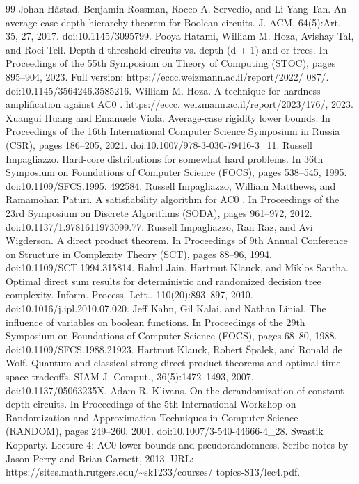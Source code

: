 \begin{thebibliography}{99}
 Johan Håstad, Benjamin Rossman, Rocco A. Servedio, and Li-Yang Tan. An average-case depth hierarchy theorem for Boolean circuits. J. ACM, 64(5):Art. 35, 27, 2017. doi:10.1145/3095799.
 Pooya Hatami, William M. Hoza, Avishay Tal, and Roei Tell. Depth-d threshold circuits vs. depth-(d + 1) and-or trees. In Proceedings of the 55th Symposium on Theory of Computing (STOC), pages 895–904, 2023. Full version: https://eccc.weizmann.ac.il/report/2022/ 087/. doi:10.1145/3564246.3585216.   
 William M. Hoza. A technique for hardness amplification against AC0 . https://eccc. weizmann.ac.il/report/2023/176/, 2023.
 Xuangui Huang and Emanuele Viola. Average-case rigidity lower bounds. In Proceedings of the 16th International Computer Science Symposium in Russia (CSR), pages 186–205, 2021. doi:10.1007/978-3-030-79416-3\_11.
 Russell Impagliazzo. Hard-core distributions for somewhat hard problems. In 36th Symposium on Foundations of Computer Science (FOCS), pages 538–545, 1995. doi:10.1109/SFCS.1995. 492584.
 Russell Impagliazzo, William Matthews, and Ramamohan Paturi. A satisfiability algorithm for AC0 . In Proceedings of the 23rd Symposium on Discrete Algorithms (SODA), pages 961–972, 2012. doi:10.1137/1.9781611973099.77.
 Russell Impagliazzo, Ran Raz, and Avi Wigderson. A direct product theorem. In Proceedings of 9th Annual Conference on Structure in Complexity Theory (SCT), pages 88–96, 1994. doi:10.1109/SCT.1994.315814.
 Rahul Jain, Hartmut Klauck, and Miklos Santha. Optimal direct sum results for deterministic and randomized decision tree complexity. Inform. Process. Lett., 110(20):893–897, 2010. doi:10.1016/j.ipl.2010.07.020.
 Jeff Kahn, Gil Kalai, and Nathan Linial. The influence of variables on boolean functions. In Proceedings of the 29th Symposium on Foundations of Computer Science (FOCS), pages 68–80, 1988. doi:10.1109/SFCS.1988.21923.
 Hartmut Klauck, Robert Špalek, and Ronald de Wolf. Quantum and classical strong direct product theorems and optimal time-space tradeoffs. SIAM J. Comput., 36(5):1472–1493, 2007. doi:10.1137/05063235X.
 Adam R. Klivans. On the derandomization of constant depth circuits. In Proceedings of the 5th International Workshop on Randomization and Approximation Techniques in Computer Science (RANDOM), pages 249–260, 2001. doi:10.1007/3-540-44666-4\_28.
 Swastik Kopparty. Lecture 4: AC0 lower bounds and pseudorandomness. Scribe notes by Jason Perry and Brian Garnett, 2013. URL: https://sites.math.rutgers.edu/\textasciitilde{}sk1233/courses/ topics-S13/lec4.pdf.

\end{thebibliography}
